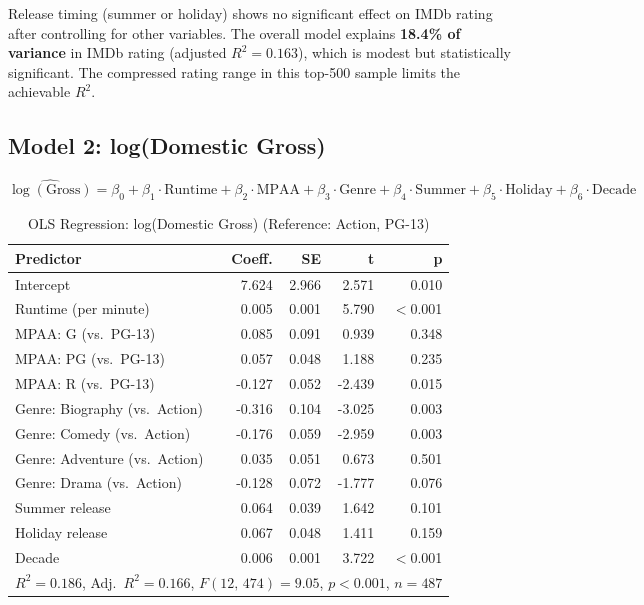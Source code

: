 \documentclass[11pt]{article}
\begin{document}
Release timing (summer or holiday) shows no significant effect on IMDb rating after controlling for other variables. The overall model explains \textbf{18.4\% of variance} in IMDb rating (adjusted $R^2 = 0.163$), which is modest but statistically significant. The compressed rating range in this top-500 sample limits the achievable $R^2$.

\subsection{Model 2: log(Domestic Gross)}

\[
\widehat{\log(\text{Gross})} = \beta_0 + \beta_1 \cdot \text{Runtime} + \beta_2 \cdot \text{MPAA} + \beta_3 \cdot \text{Genre} + \beta_4 \cdot \text{Summer} + \beta_5 \cdot \text{Holiday} + \beta_6 \cdot \text{Decade}
\]

\begin{table}[H]
\centering
\caption{OLS Regression: log(Domestic Gross) (Reference: Action, PG-13)}
\begin{tabular}{lrrrr}
\toprule
\textbf{Predictor} & \textbf{Coeff.} & \textbf{SE} & \textbf{t} & \textbf{p} \\
\midrule
Intercept                  &  7.624 & 2.966 &  2.571 & 0.010 \\
Runtime (per minute)       &  0.005 & 0.001 &  5.790 & $<$0.001 \\
MPAA: G (vs.\ PG-13)      &  0.085 & 0.091 &  0.939 & 0.348 \\
MPAA: PG (vs.\ PG-13)     &  0.057 & 0.048 &  1.188 & 0.235 \\
MPAA: R (vs.\ PG-13)      & -0.127 & 0.052 & -2.439 & 0.015 \\
Genre: Biography (vs.\ Action) & -0.316 & 0.104 & -3.025 & 0.003 \\
Genre: Comedy (vs.\ Action)   & -0.176 & 0.059 & -2.959 & 0.003 \\
Genre: Adventure (vs.\ Action) &  0.035 & 0.051 &  0.673 & 0.501 \\
Genre: Drama (vs.\ Action)    & -0.128 & 0.072 & -1.777 & 0.076 \\
Summer release             &  0.064 & 0.039 &  1.642 & 0.101 \\
Holiday release            &  0.067 & 0.048 &  1.411 & 0.159 \\
Decade                     &  0.006 & 0.001 &  3.722 & $<$0.001 \\
\midrule
\multicolumn{5}{l}{$R^2 = 0.186$, Adj.\ $R^2 = 0.166$, $F(12,\,474) = 9.05$, $p < 0.001$, $n = 487$} \\
\bottomrule
\end{tabular}
\end{table}
\end{document}
